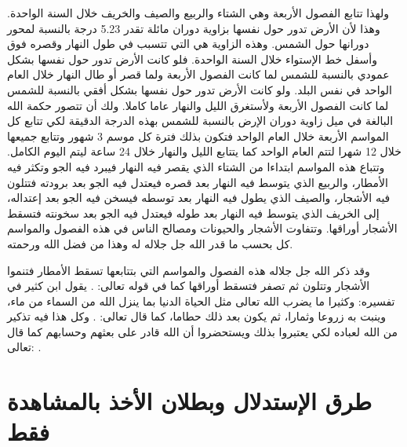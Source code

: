 ولهذا تتابع الفصول الأربعة وهي الشتاء والربيع والصيف والخريف خلال السنة الواحدة. وهذا لأن الأرض تدور حول نفسها بزاوية دوران مائلة تقدر 5.23 درجة بالنسبة لمحور دورانها حول الشمس. وهذه الزاوية هي التي تتسبب في طول النهار وقصره فوق وأسفل خط الإستواء خلال السنة الواحدة. فلو كانت الأرض تدور حول نفسها بشكل عمودي بالنسبة للشمس لما كانت الفصول الأربعة ولما قصر أو طال النهار خلال العام الواحد في نفس البلد. ولو كانت الأرض تدور حول نفسها بشكل أفقي بالنسبة للشمس لما كانت الفصول الأربعة ولأستغرق الليل والنهار عاما كاملا. ولك أن تتصور حكمة الله البالغة في ميل زاوية دوران الإرض بالنسبة للشمس بهذه الدرجة الدقيقة لكي تتابع كل المواسم الأربعة خلال العام الواحد فتكون بذلك فترة كل موسم 3 شهور وتتابع جميعها خلال 12 شهرا لتتم العام الواحد كما يتتابع الليل والنهار خلال 24 ساعة ليتم اليوم الكامل. وتتباع هذه المواسم ابتداءا من الشتاء الذي يقصر فيه النهار فيبرد فيه الجو وتكثر فيه الأمطار، والربيع الذي يتوسط فيه النهار بعد قصره فيعتدل فيه الجو بعد برودته فتتلون فيه الأشجار، والصيف الذي يطول فيه النهار بعد توسطه فيسخن فيه الجو بعد إعتداله، إلى الخريف الذي يتوسط فيه النهار بعد طوله فيعتدل فيه الجو بعد سخونته فتسقط الأشجار أوراقها. وتتفاوت الأشجار والحيونات ومصالح الناس في هذه الفصول والمواسم كل بحسب ما قدر الله جل جلاله له وهذا من فضل الله ورحمته.

وقد ذكر الله جل جلاله هذه الفصول والمواسم التي بتتابعها تسقط الأمطار فتنموا الأشجار وتتلون ثم تصفر فتسقط أوراقها كما في قوله تعالى: \quranayah*[39][21]{\footnotesize \surahname*[39]}. يقول ابن كثير في تفسيره: وكثيرا ما يضرب الله تعالى مثل الحياة الدنيا بما ينزل الله من السماء من ماء، وينبت به زروعا وثمارا، ثم يكون بعد ذلك حطاما، كما قال تعالى: \quranayah*[18][45]{\footnotesize \surahname*[18]} \href{https://shamela.ws/book/8473/3591#p4}{\faExternalLink} \cite{tafsir_ibnKathir}. وكل هذا فيه تذكير من الله لعباده لكي يعتبروا بذلك ويستحضروا أن الله قادر على بعثهم وحسابهم كما قال تعالى: \quranayah*[30][50]{\footnotesize \surahname*[9]}. 

\section{طرق الإستدلال وبطلان الأخذ بالمشاهدة فقط}

